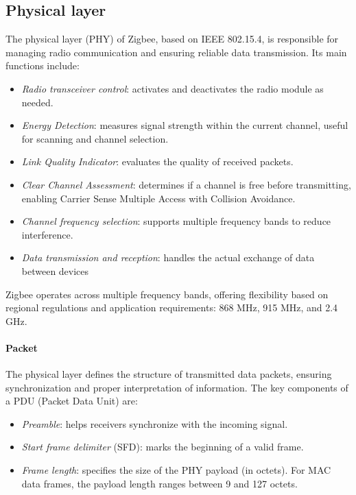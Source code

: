 \subsection{Physical layer}
The physical layer (PHY) of Zigbee, based on IEEE 802.15.4, is responsible for managing radio communication and ensuring reliable data transmission. 
Its main functions include:
\begin{itemize}
    \item \textit{Radio transceiver control}: activates and deactivates the radio module as needed.
    \item \textit{Energy Detection}: measures signal strength within the current channel, useful for scanning and channel selection.
    \item \textit{Link Quality Indicator}: evaluates the quality of received packets.
    \item \textit{Clear Channel Assessment}: determines if a channel is free before transmitting, enabling Carrier Sense Multiple Access with Collision Avoidance.
    \item \textit{Channel frequency selection}: supports multiple frequency bands to reduce interference.
    \item \textit{Data transmission and reception}: handles the actual exchange of data between devices
\end{itemize}
\noindent Zigbee operates across multiple frequency bands, offering flexibility based on regional regulations and application requirements: 868 MHz, 915 MHz, and 2.4 GHz. 

\paragraph*{Packet}
The physical layer defines the structure of transmitted data packets, ensuring synchronization and proper interpretation of information. 
The key components of a PDU (Packet Data Unit) are:
\begin{itemize}
    \item \textit{Preamble}: helps receivers synchronize with the incoming signal.
    \item \textit{Start frame delimiter} (SFD): marks the beginning of a valid frame.
    \item \textit{Frame length}: specifies the size of the PHY payload (in octets).
        For MAC data frames, the payload length ranges between 9 and 127 octets.
\end{itemize}

